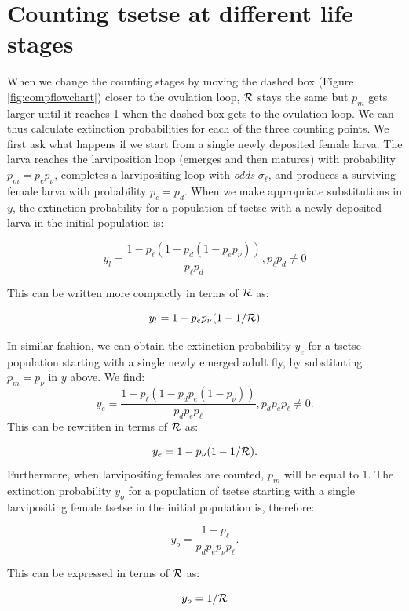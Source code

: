 \documentclass[smallextended]{svjour3}
\begin{document}
\section{Counting tsetse at different life stages}

When we change the counting stages by moving the dashed box (Figure \ref{fig:compflowchart}) closer to the ovulation loop, ${\cal R}$ stays the same but $p_m$ gets larger until it reaches 1 when the dashed box gets to the ovulation loop. We can thus calculate extinction probabilities for each of  the three counting points. We first ask what happens if we start from a single newly deposited female larva.
The larva reaches the larviposition loop (emerges and then matures) with probability $p_m = p_e p_{\nu}$, completes a larvipositing loop with \textit{odds} $\sigma_\ell$, and produces a surviving female larva with probability $p_c = p_d$. 
When we make appropriate substitutions in $y$, the extinction probability for a population of tsetse with a newly deposited larva in the initial population is:

$$y_l = \frac{1-p_{\ell}(1 - p_{d}(1 - p_{e}p_{\nu}))}{p_{\ell}p_{d}}, p_{\ell}p_{d} \neq 0$$

This can be written more compactly in terms of ${\cal R}$ as:

\begin{equation}
	\label{NewEqn2}
	y_l = 1 - p_ep_{\nu}(1-1/{\cal R})	
\end{equation}

In similar fashion, we can obtain the extinction probability $y_e$ for a tsetse population starting with a single newly emerged adult fly, by substituting  $p_m = p_{\nu}$ in $y$ above.
We find:
$$ y_e=\frac{1- p_{\ell}(1 -p_{d}p_{e}(1- p_{\nu}))}{p_{d}p_{e}p_{\ell}},  p_{d}p_{e}p_{\ell} \neq 0. $$ This can be rewritten in terms of ${\cal R}$ as:

\begin{equation}
	\label{NewEqn3}
	y_e = 1 - p_{\nu}(1-1/{\cal R}).	
\end{equation}
Furthermore, when  larvipositing females are counted, $p_m$ will be equal to 1. The extinction probability $y_o$ for a population of tsetse starting with a single larvipositing female tsetse in the initial population is, therefore:

$$y_o = \frac{1-p_{\ell}}{p_{d}p_{e}p_{\nu}p_{\ell}}.$$

This can be expressed in terms of ${\cal R}$ as:

\begin{equation}
	\label{NewEqn4}
	y_o = 1/{\cal R}	
\end{equation}
\end{document}
